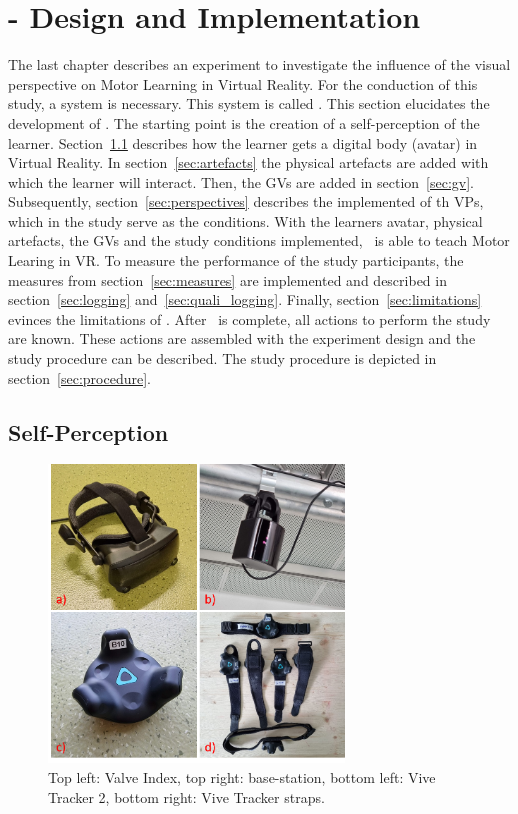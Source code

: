 \chapter{\exgo - Design and Implementation}
\label{chapter:system}
The last chapter describes an experiment to investigate the influence of the visual perspective on Motor Learning in Virtual Reality. For the conduction of this study, a system is necessary. This system is called \exgo. This section elucidates the development of \exgo. The starting point is the creation of a self-perception of the learner. 
Section~\ref{sec:selfperception} describes how the learner gets a digital body (avatar) in Virtual Reality.
In section~\ref{sec:artefacts} the physical artefacts are added with which the learner will interact. Then, the GVs are added in section~\ref{sec:gv}. Subsequently, section~\ref{sec:perspectives} describes the implemented of th VPs, which in the study serve as the conditions. With the learners avatar, physical artefacts, the GVs and the study conditions implemented, \exgo\ is able to teach Motor Learing in VR. To measure the performance of the study participants, the measures from section~\ref{sec:measures} are implemented and described in section~\ref{sec:logging} and~\ref{sec:quali_logging}. 
Finally, section~\ref{sec:limitations} evinces the limitations of \exgo.
After \exgo\ is complete, all actions to perform the study are known. These actions are assembled with the experiment design and the study procedure can be described. The study procedure is depicted in section~\ref{sec:procedure}.

\section{Self-Perception}
\label{sec:selfperception}
\begin{figure}[H]
	\centering
	\includegraphics[width=0.7\textwidth]{figures/hardware.png}
	\caption[Hardware]{Top left: Valve Index, top right: base-station, bottom left: Vive Tracker 2, bottom right: Vive Tracker straps.}
	\label{fig:hardware}
\end{figure}

